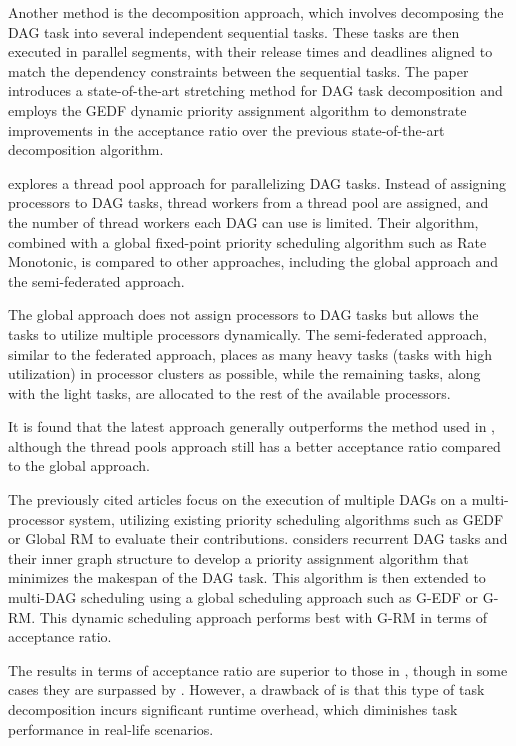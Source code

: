 Another method is the decomposition approach, which involves 
decomposing the DAG task into several independent sequential tasks. 
These tasks are then executed in parallel segments, with their 
release times and deadlines aligned to match the dependency constraints 
between the sequential tasks\cite{CaoStretchingDAGs2020}. The paper 
\cite{CaoStretchingDAGs2020} introduces a state-of-the-art 
stretching method for DAG task decomposition and employs the GEDF 
dynamic priority assignment algorithm to demonstrate improvements 
in the acceptance ratio over the previous state-of-the-art 
decomposition algorithm.

\cite{SchmidResponseDAGThreadpools2021} explores a thread pool 
approach for parallelizing DAG tasks. Instead of assigning 
processors to DAG tasks, thread workers from a thread pool are 
assigned, and the number of thread workers each DAG can use is 
limited. Their algorithm, combined with a global fixed-point 
priority scheduling algorithm such as Rate Monotonic, is compared 
to other approaches, including the global approach and the 
semi-federated approach.

The global approach does not assign processors to DAG tasks but 
allows the tasks to utilize multiple processors dynamically. 
The semi-federated approach, similar to the federated approach, 
places as many heavy tasks (tasks with high utilization) in processor 
clusters as possible, while the remaining tasks, along with the 
light tasks, are allocated to the rest of the available processors.

It is found that the latest approach generally outperforms 
the method used in \cite{SchmidResponseDAGThreadpools2021}, although the 
thread pools approach still has a better acceptance ratio compared 
to the global approach.

The previously cited articles focus on the execution of multiple 
DAGs on a multi-processor system, utilizing existing priority 
scheduling algorithms such as GEDF or Global RM to evaluate their 
contributions. \cite{he2019intra} considers recurrent DAG tasks 
and their inner graph structure to develop a priority assignment 
algorithm that minimizes the makespan of the DAG task. This 
algorithm is then extended to multi-DAG scheduling using a global 
scheduling approach such as G-EDF or G-RM. This dynamic scheduling 
approach performs best with G-RM in terms of acceptance ratio.

The results in terms of acceptance ratio are superior to those in 
\cite{SchmidResponseDAGThreadpools2021}, though in some cases they 
are surpassed by \cite{CaoStretchingDAGs2020}. However, a 
drawback of \cite{CaoStretchingDAGs2020} is that this type of task 
decomposition incurs significant runtime overhead, which diminishes 
task performance in real-life scenarios.

